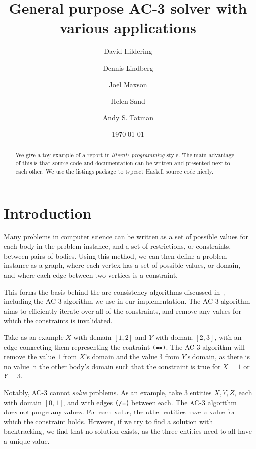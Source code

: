 \documentclass[12pt,a4paper]{article}
\title{General purpose AC-3 solver with various applications}
\author{David Hildering \and Dennis Lindberg \and Joel Maxson \and Helen Sand \and Andy S. Tatman}
\date{\today}
\begin{document}
\maketitle

\begin{abstract}
We give a toy example of a report in \emph{literate programming} style.
The main advantage of this is that source code and documentation can
be written and presented next to each other.
We use the listings package to typeset Haskell source code nicely.
\end{abstract}

\vfill

\tableofcontents

\clearpage


% 

\section{Introduction}
Many problems in computer science can be written as a set of possible values for each 
body in the problem instance, and a set of restrictions, or constraints, between pairs of bodies.
Using this method, we can then define a problem instance as a graph, where each vertex has a set of possible values, or domain,
and where each edge between two vertices is a constraint.  

This forms the basis behind the arc consistency algorithms discussed in~\cite{AC3}, including the AC-3 algorithm 
we use in our implementation. 
The AC-3 algorithm aims to efficiently iterate over all of the constraints, 
and remove any values for which the constraints is invalidated.

Take as an example $X$ with domain $[1,2]$ and $Y$ with domain $[2,3]$, with an edge connecting them representing the contraint \verb:(==):.
The AC-3 algorithm will remove the value $1$ from $X$'s domain and the value $3$ from $Y$'s domain, 
as there is no value in the other body's domain such that the constraint is true for $X=1$ or $Y=3$.


Notably, AC-3 cannot \emph{solve} problems. As an example, take 3 entities $X,Y,Z$, 
each with domain $[0,1]$, and with edges \verb:(/=): between each. 
The AC-3 algorithm does not purge any values. For each value, the other entities have a 
value for which the constraint holds.
However, if we try to find a solution with backtracking, we find that no solution exists, as 
the three entities need to all have a unique value. 
\end{document}
